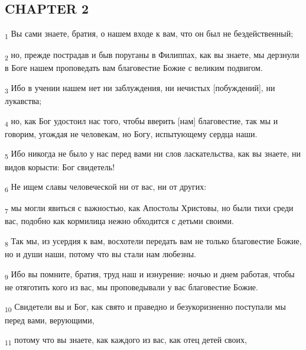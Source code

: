 \subsection{CHAPTER 2}
\begin{tcolorbox}
\textsubscript{1} Вы сами знаете, братия, о нашем входе к вам, что он был не бездейственный;
\end{tcolorbox}
\begin{tcolorbox}
\textsubscript{2} но, прежде пострадав и быв поруганы в Филиппах, как вы знаете, мы дерзнули в Боге нашем проповедать вам благовестие Божие с великим подвигом.
\end{tcolorbox}
\begin{tcolorbox}
\textsubscript{3} Ибо в учении нашем нет ни заблуждения, ни нечистых [побуждений], ни лукавства;
\end{tcolorbox}
\begin{tcolorbox}
\textsubscript{4} но, как Бог удостоил нас того, чтобы вверить [нам] благовестие, так мы и говорим, угождая не человекам, но Богу, испытующему сердца наши.
\end{tcolorbox}
\begin{tcolorbox}
\textsubscript{5} Ибо никогда не было у нас перед вами ни слов ласкательства, как вы знаете, ни видов корысти: Бог свидетель!
\end{tcolorbox}
\begin{tcolorbox}
\textsubscript{6} Не ищем славы человеческой ни от вас, ни от других:
\end{tcolorbox}
\begin{tcolorbox}
\textsubscript{7} мы могли явиться с важностью, как Апостолы Христовы, но были тихи среди вас, подобно как кормилица нежно обходится с детьми своими.
\end{tcolorbox}
\begin{tcolorbox}
\textsubscript{8} Так мы, из усердия к вам, восхотели передать вам не только благовестие Божие, но и души наши, потому что вы стали нам любезны.
\end{tcolorbox}
\begin{tcolorbox}
\textsubscript{9} Ибо вы помните, братия, труд наш и изнурение: ночью и днем работая, чтобы не отяготить кого из вас, мы проповедывали у вас благовестие Божие.
\end{tcolorbox}
\begin{tcolorbox}
\textsubscript{10} Свидетели вы и Бог, как свято и праведно и безукоризненно поступали мы перед вами, верующими,
\end{tcolorbox}
\begin{tcolorbox}
\textsubscript{11} потому что вы знаете, как каждого из вас, как отец детей своих,
\end{tcolorbox}
